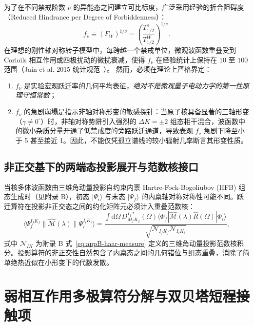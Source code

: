 为了在不同禁戒阶数 $\nu$ 的异能态之间建立可比标度，广泛采用经验的折合阻碍度（Reduced Hindrance per Degree of Forbiddenness）：
\begin{equation}\label{eq:appD-fnu-def}
f_\nu \equiv (F_W)^{1/\nu} = \left( \frac{T_{1/2}^\gamma}{T_{1/2}^W} \right)^{1/\nu}.
\end{equation}
在理想的刚性轴对称转子模型中，每跨越一个禁戒单位，微观波函数重叠受到 Corioils 相互作用或四极扰动的微扰衰减，使得 $f_\nu$ 在经验统计上保持在 $10$ 至 $100$ 范围（Jain et al. 2015 统计规范~\cite{book-jain-nuclear-isomers}）。
然而，必须在理论上严格界定：
\begin{enumerate}
\item $f_\nu$ 是实验宏观跃迁率的几何平均表征，\emph{绝对不是微观量子电动力学的第一性原理守恒常数}；
\item $f_\nu$ 的急剧崩塌是指示非轴对称形变的敏感探针：当原子核具备显著的三轴形变（$\gamma \ne 0^\circ$）时，非轴对称势阱引入强烈的 $\Delta K = \pm 2$ 组态相干混合，波函数中的微小杂质分量开通了低禁戒度的旁路跃迁通道，导致表观 $f_\nu$ 急剧下降至小于 5 甚至接近 1。因此，不能仅凭孤立谱线的较小辐射几率断言其形变性质。
\end{enumerate}

\subsection{非正交基下的两端态投影展开与范数核接口}

当核多体波函数由三维角动量投影自约束内禀 Hartre-Fock-Bogoliubov (HFB) 组态生成时（见附录 B），初态 $|\Psi_i\rangle$ 与末态 $|\Psi_f\rangle$ 的内禀轴对称对称性可能不同。跃迁算符在投影非正交态之间的约化矩阵元必须计入重叠范数核：
\begin{equation}\label{eq:appD-projected-nme}
\langle \Psi_f^{I_f K_f} \| \hat{\mathcal{M}}(\lambda) \| \Psi_i^{I_i K_i} \rangle = \frac{\int \mathrm{d}\Omega \, D^{I_f *}_{M_f K_f}(\Omega) \langle \Phi_f | \hat{\mathcal{M}}(\lambda) \hat{R}(\Omega) | \Phi_i \rangle}{\sqrt{\mathcal{N}_{I_f K_f} \mathcal{N}_{I_i K_i}}},
\end{equation}
式中 $\mathcal{N}_{IK}$ 为附录 B 式~\eqref{eq:appB-haar-measure} 定义的三维角动量投影范数核积分。投影算符的非正交性自然包含了内禀态之间的几何错位与组态重叠，消除了简单绝热近似在小形变下的代数发散。

\section{弱相互作用多极算符分解与双贝塔短程接触项}\label{sec:appD-weak-operators}

